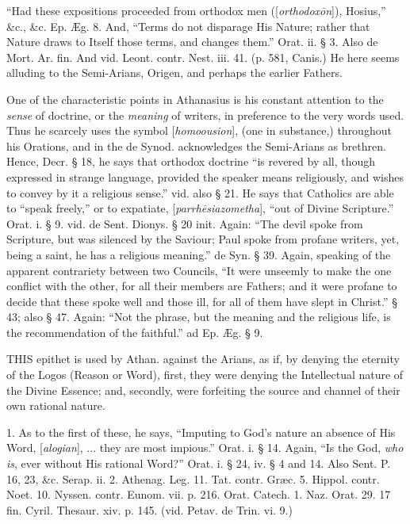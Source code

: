 ``Had these expositions proceeded from orthodox
men ([\emph{orthodox\={o}n}]), Hosius,'' \&c., \&c. Ep. Æg.
8. And, ``Terms do not disparage His Nature; rather that Nature draws
to Itself those terms, and changes them.'' Orat. ii. § 3. Also de
Mort. Ar. fin. And vid. Leont. contr. Nest. iii. 41. (p. 581, Canis.)
He here seems alluding to the Semi-Arians, Origen, and perhaps the
earlier Fathers.

One of the characteristic points in Athanasius is
his constant attention to the \emph{sense} of doctrine, or the \emph{meaning}
of writers, in preference to the very words used. Thus he scarcely
uses the symbol [\emph{homoousion}], (one in substance,) throughout
his Orations, and in the de Synod. acknowledges the Semi-Arians as
brethren. Hence, Decr. § 18, he says that orthodox doctrine ``is
revered by all, though expressed in strange language, provided the
speaker means religiously, and wishes to convey by it a religious
sense.'' vid. also § 21. He says that Catholics are able to ``speak
freely,'' or to expatiate, [\emph{parrh\={e}siazometha}], ``out of
Divine Scripture.'' Orat. i. § 9. vid. de Sent. Dionys. § 20 init.
Again: ``The devil spoke from Scripture, but was silenced by the
Saviour; Paul spoke from profane writers, yet, being a saint, he has a
religious meaning.'' de Syn. § 39. Again, speaking of the apparent
contrariety between two Councils, ``It were unseemly to make the one
conflict with the other, for all their members are Fathers; and it
were profane to decide that these spoke well and those ill, for all of
them have slept in Christ.'' § 43; also § 47. Again: ``Not the phrase,
but the meaning and the religious life, is the recommendation of the
faithful.'' ad Ep. Æg. § 9.


THIS
epithet is used by Athan. against the Arians, as if, by denying the
eternity of the Logos (Reason or Word), first, they were denying the
Intellectual nature of the Divine Essence; and, secondly, were
forfeiting the source and channel of their own rational nature.

1. As to the first of these, he says, ``Imputing
to God's nature an absence of His Word, [\emph{alogian}], ... they are
most impious.'' Orat. i. § 14. Again, ``Is the God, \emph{who is}, ever
without His rational Word?'' Orat. i. § 24, iv. § 4 and 14. Also
Sent. P. 16, 23, \&c. Serap. ii. 2. Athenag. Leg. 11. Tat. contr.
Græc. 5. Hippol. contr. Noet. 10. Nyssen. contr. Eunom. vii. p. 216.
Orat. Catech. 1. Naz. Orat. 29. 17 fin. Cyril. Thesaur. xiv. p. 145. (vid.
Petav. de Trin. vi. 9.)

